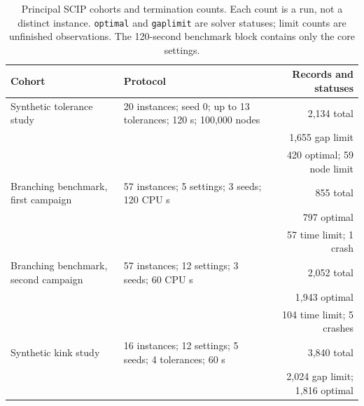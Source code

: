 \begin{table}[tbp]
  \centering
  \small
  \caption{Principal SCIP cohorts and termination counts. Each count is
  a run, not a distinct instance. \texttt{optimal} and \texttt{gaplimit}
  are solver statuses; limit counts are unfinished observations. The
  120-second benchmark block contains only the core settings.}
  \label{experiments:tab-protocols}
  \begin{tabular}{@{}p{}p{}r@{}}
    \toprule
    Cohort & Protocol & Records and statuses \\
    \midrule
    Synthetic tolerance study & 20 instances; seed 0; up to 13 tolerances;
    120 s; 100,000 nodes & 2,134 total \\
    & & 1,655 gap limit \\
    & & 420 optimal; 59 node limit \\
    \addlinespace
    Branching benchmark, first campaign & 57 instances; 5 settings;
    3 seeds; 120 CPU s & 855 total \\
    & & 797 optimal \\
    & & 57 time limit; 1 crash \\
    \addlinespace
    Branching benchmark, second campaign & 57 instances; 12 settings;
    3 seeds; 60 CPU s & 2,052 total \\
    & & 1,943 optimal \\
    & & 104 time limit; 5 crashes \\
    \addlinespace
    Synthetic kink study & 16 instances; 12 settings; 5 seeds;
    4 tolerances; 60 s & 3,840 total \\
    & & 2,024 gap limit; 1,816 optimal \\
    \bottomrule
  \end{tabular}
\end{table}
